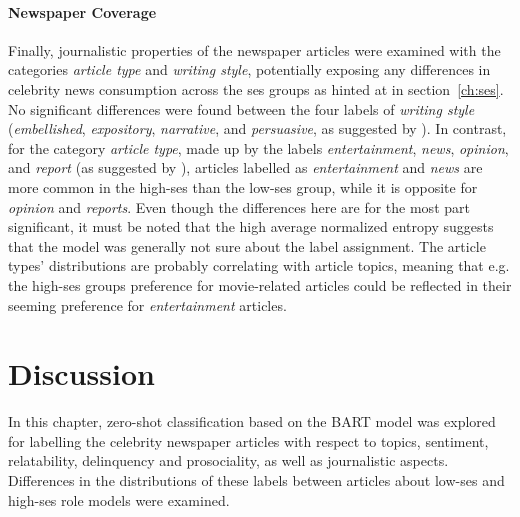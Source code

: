\paragraph{Newspaper Coverage}
Finally, journalistic properties of the newspaper articles were examined with the categories \textit{article type} and \textit{writing style}, potentially exposing any differences in celebrity news consumption across the \gls{ses} groups as hinted at in section~\ref{ch:ses}. No significant differences were found between the four labels of \textit{writing style} (\textit{embellished}, \textit{expository}, \textit{narrative}, and \textit{persuasive}, as suggested by \textcite{traffis_learn_2017}). In contrast, for the category \textit{article type}, made up by the labels \textit{entertainment}, \textit{news}, \textit{opinion}, and \textit{report} (as suggested by \cite{davis_4_2022}), articles labelled as \textit{entertainment} and \textit{news} are more common in the high-\gls{ses} than the low-\gls{ses} group, while it is opposite for \textit{opinion} and \textit{reports}. Even though the differences here are for the most part significant, it must be noted that the high average normalized entropy suggests that the model was generally not sure about the label assignment. The article types' distributions are probably correlating with article topics, meaning that e.g. the high-\gls{ses} groups preference for movie-related articles could be reflected in their seeming preference for \textit{entertainment} articles.

\section{Discussion}
In this chapter, zero-shot classification based on the BART model was explored for labelling the celebrity newspaper articles with respect to topics, sentiment, relatability, delinquency and prosociality, as well as journalistic aspects. Differences in the distributions of these labels between articles about low-\gls{ses} and high-\gls{ses} role models were examined.


